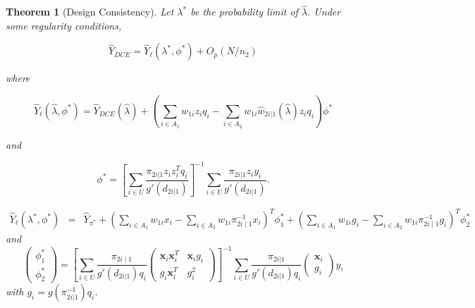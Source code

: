 \documentclass[12pt]{article}
\newtheorem{theorem}{Theorem}
\newcommand{\bx}{\mathbf{x}}
\begin{document}
\begin{theorem}[Design Consistency]\label{thm:dc1}
  Let $\lambda^*$ be the probability limit of $\hat \lambda$.
  Under some regularity conditions,

  $$\hat Y_{DCE} = \hat Y_\ell(\lambda^*, \phi^*) + O_p(N / n_2)$$

  where

  $$\hat Y_{\ell}(\hat \lambda, \phi^*) = \hat Y_{DCE}(\hat \lambda) + 
  \left(\sum_{i \in A_1} w_{1i} z_i q_i - \sum_{i \in A_2} w_{1i} \hat w_{2i|1}(\hat
  \lambda) z_i q_i\right)\phi^*$$

  and

  $$\phi^* = 
  \left[\sum_{i \in U} \frac{\pi_{2i|1}z_i z_i^T q_i}{g'(d_{2i|1})}\right]^{-1}
  \sum_{i \in U} \frac{\pi_{2i|1}z_i y_i}{g'(d_{2i|1})}.$$

   \begin{eqnarray*}
   \hat Y_{\ell}( \lambda^*, \phi^*) &=&   \hat{Y}_{\pi^*} + 
  \left(\sum_{i \in A_1} w_{1i} x_i  -  \sum_{i \in A_2} w_{1i} \pi_{2i \mid
  1}^{-1} x_i  \right)^T \phi_1^* + \left(\sum_{i \in A_1} w_{1i} g_i   -
\sum_{i \in A_2} w_{1i} \pi_{2i \mid 1}^{-1}g_i  \right)^T \phi_2^*  
  \end{eqnarray*} 
  and  $$\begin{pmatrix}
  \phi_1^* \\
  \phi_2^* 
  \end{pmatrix}
  = \left[ \sum_{i \in U} \frac{\pi_{2i \mid 1} }{ g'(d_{2i|1}) q_i} 
  \begin{pmatrix}
  \bx_i \bx_i^T &   \bx_i g_i   \\
  g_i  \bx_i^T   & g_i^2     \end{pmatrix} \right]^{-1}
  \sum_{i \in U} \frac{\pi_{2i|1}}{ g'(d_{2i | 1}) q_i} \begin{pmatrix}
    \bx_i \\ g_i 
  \end{pmatrix}y_i $$
with $g_i = g( \pi_{2i |1}^{-1}) q_i$.
\end{theorem}
\end{document}
